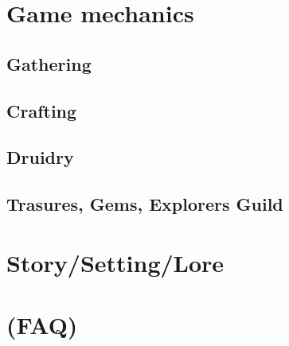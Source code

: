 \documentclass[a4paper,11pt]{scrreprt}
\begin{document}
\chapter{Game mechanics}
\section{Gathering}
\section{Crafting}
\section{Druidry}
\section{Trasures, Gems, Explorers Guild}
\chapter{Story/Setting/Lore}
\chapter{(FAQ)}
\end{document}
